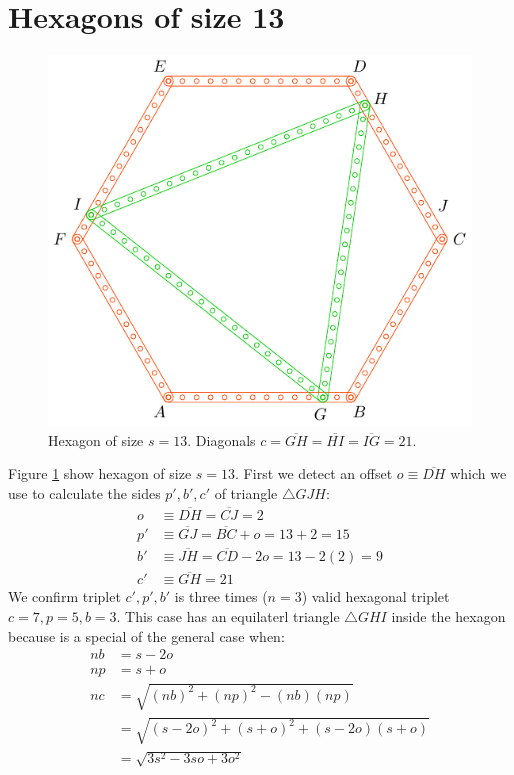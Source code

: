 \documentclass[11pt]{article}
\begin{document}
\section{Hexagons of size 13}

\begin{figure}[H]
\centering
\includegraphics[scale=1]{13/hexa-13a}
\caption{Hexagon of size $s = 13$. Diagonals $c = \overline{GH} = \overline{HI} = \overline{IG} = 21$.}
\label{fig:13a}
\end{figure}

Figure \ref{fig:13a} show hexagon of size $s = 13$. First we detect an offset $o \equiv \overline{DH}$ which we use to calculate the sides $p',b',c'$ of triangle $\triangle{GJH}$:
\begin{align}
o &\equiv \overline{DH} = \overline{CJ} = 2 \nonumber\\
p' &\equiv \overline{GJ} = \overline{BC} + o = 13+2 = 15 \nonumber\\
b' &\equiv \overline{JH} = \overline{CD} - 2o = 13 - 2(2) = 9 \nonumber\\
c' &\equiv \overline{GH} = 21
\end{align}
We confirm triplet $c',p',b'$ is three times ($n=3$) valid hexagonal triplet $c=7,p=5,b=3$.
This case has an equilaterl triangle $\triangle{GHI}$ inside the hexagon because is a special of the general case when:
\begin{align}
nb &= s - 2o \nonumber\\
np &= s + o \nonumber\\
nc &= \sqrt{(nb)^2 + (np)^2 - (nb)(np)} \nonumber\\
   &= \sqrt{(s - 2o)^2 + (s+o)^2 + (s - 2o)(s+o)} \nonumber\\
   &= \sqrt{3s^2 - 3so + 3o^2}
\end{align}
\end{document}
